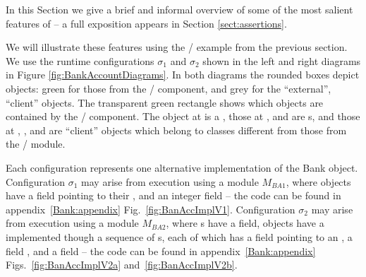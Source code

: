 %
In this Section we  give a brief and informal  overview of some of the most salient features of  
\Chainmail -- a full exposition appears in Section \ref{sect:assertions}.



 We  will illustrate these features using the  / example from the previous section.
We   use the runtime configurations $\sigma_1$ and $\sigma_2$ 
shown in the left and right diagrams in Figure \ref{fig:BankAccountDiagrams}.
In both diagrams the rounded boxes depict objects:  green for those from the 
/ component, and grey for the ``external'',  ``client'' objects.
The transparent green rectangle  shows which objects are contained by the / component.
The object at  is a , those at ,  and  are 
s, and those at , ,  and  are 
``client'' objects which belong to classes different from those from the /  module.

Each configuration represents one alternative implementation of the Bank object.
Configuration  $\sigma_1$ may arise from execution using a module $M_{BA1}$, where   objects
  have a field  pointing to their , and an integer field  
-- the code can be found in appendix~\ref{Bank:appendix} Fig.~\ref{fig:BanAccImplV1}.
Configuration  $\sigma_2$ may arise from execution using a module $M_{BA2}$,  where s have a 
field,   objects  have a  implemented though a sequence of s, each of which has a
 field pointing to an , a field , and a
 field  -- the code can be found in appendix~\ref{Bank:appendix}
Figs.~\ref{fig:BanAccImplV2a} and~\ref{fig:BanAccImplV2b}.

